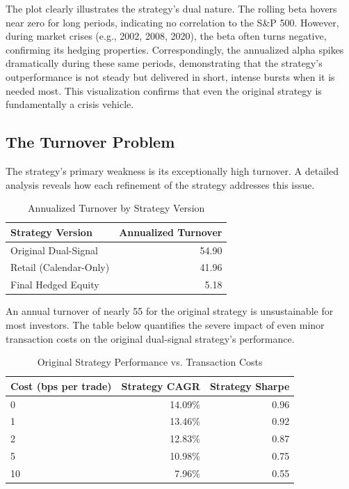 \documentclass{article}
\begin{document}
The plot clearly illustrates the strategy's dual nature. The rolling beta hovers near zero for long periods, indicating no correlation to the S\&P 500. However, during market crises (e.g., 2002, 2008, 2020), the beta often turns negative, confirming its hedging properties. Correspondingly, the annualized alpha spikes dramatically during these same periods, demonstrating that the strategy's outperformance is not steady but delivered in short, intense bursts when it is needed most. This visualization confirms that even the original strategy is fundamentally a crisis vehicle.

\subsection{The Turnover Problem}
The strategy's primary weakness is its exceptionally high turnover. A detailed analysis reveals how each refinement of the strategy addresses this issue.

\begin{table}[htbp]
\centering
\caption{Annualized Turnover by Strategy Version}
\begin{tabular}{lr}
\toprule
\textbf{Strategy Version} & \textbf{Annualized Turnover} \\
\midrule
Original Dual-Signal      & 54.90 \\
Retail (Calendar-Only)    & 41.96 \\
Final Hedged Equity       & 5.18  \\
\bottomrule
\end{tabular}
\end{table}

An annual turnover of nearly 55 for the original strategy is unsustainable for most investors. The table below quantifies the severe impact of even minor transaction costs on the original dual-signal strategy's performance.

\begin{table}[htbp]
\centering
\caption{Original Strategy Performance vs. Transaction Costs}
\begin{tabular}{lrr}
\toprule
\textbf{Cost (bps per trade)} & \textbf{Strategy CAGR} & \textbf{Strategy Sharpe} \\
\midrule
0          & 14.09\%        & 0.96            \\
1          & 13.46\%        & 0.92            \\
2          & 12.83\%        & 0.87            \\
5          & 10.98\%        & 0.75            \\
10         & 7.96\%         & 0.55            \\
\bottomrule
\end{tabular}
\end{table}
\end{document}
